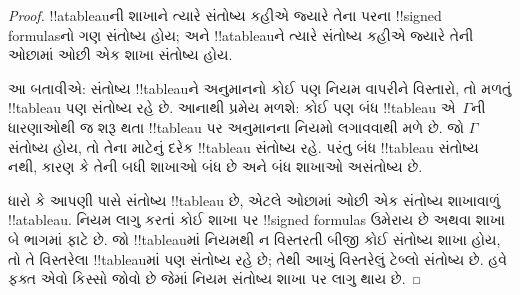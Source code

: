 \documentclass[../../../include/open-logic-section]{subfiles}
\begin{document}
\begin{proof}
!!a{tableau}ની શાખાને ત્યારે સંતોષ્ય કહીએ જ્યારે
તેના પરના !!{signed formula}sનો ગણ સંતોષ્ય હોય;
અને !!a{tableau}ને ત્યારે સંતોષ્ય કહીએ જ્યારે
તેની ઓછામાં ઓછી એક શાખા સંતોષ્ય હોય.

આ બતાવીએ: સંતોષ્ય !!{tableau}ને અનુમાનનો કોઈ પણ
નિયમ વાપરીને વિસ્તારો, તો મળતું !!{tableau} પણ
સંતોષ્ય રહે છે. આનાથી પ્રમેય મળશે: કોઈ પણ બંધ
!!{tableau} એ~$\Gamma$ની ધારણાઓથી જ શરૂ થતા
!!{tableau} પર અનુમાનના નિયમો લગાવવાથી મળે છે.
જો $\Gamma$ સંતોષ્ય હોય, તો તેના માટેનું દરેક
!!{tableau} સંતોષ્ય રહે. પરંતુ બંધ !!{tableau}
સંતોષ્ય નથી, કારણ કે તેની બધી શાખાઓ બંધ છે
અને બંધ શાખાઓ અસંતોષ્ય છે.

ધારો કે આપણી પાસે સંતોષ્ય !!{tableau} છે,
એટલે ઓછામાં ઓછી એક સંતોષ્ય શાખાવાળું
!!a{tableau}. નિયમ લાગુ કરતાં કોઈ શાખા પર
!!{signed formula}s ઉમેરાય છે અથવા શાખા
બે ભાગમાં ફાટે છે. જો !!{tableau}માં નિયમથી ન વિસ્તરતી
બીજી કોઈ સંતોષ્ય શાખા હોય, તો તે વિસ્તરેલા
!!{tableau}માં પણ સંતોષ્ય રહે છે; તેથી આખું
વિસ્તરેલું ટેબ્લો સંતોષ્ય છે. હવે ફક્ત એવો
કિસ્સો જોવો છે જેમાં નિયમ સંતોષ્ય શાખા પર
લાગુ થાય છે.


\end{proof}
\end{document}
